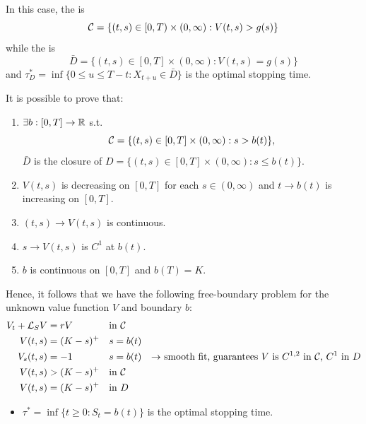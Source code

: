 \begin{remark}
    In this case, the  is
    \[ \mathcal{C} = \{ (t,s) \in [0,T) \times (0, \infty) : V(t,s) > g(s) \} \]
    while the  is
    \[ \bar{D} = \{ (t,s) \in [0,T] \times (0, \infty) : V(t,s) = g(s) \} \]
    and $\tau_D^* = \inf \{ 0 \leq u \leq T-t : X_{t+u} \in \bar{D} \}$ is the optimal stopping time.
    
    It is possible to prove that:
    \begin{enumerate}[label=\alph*)]
        \item $\exists b : [0,T] \to \mathbb R$ s.t.
        \[ \mathcal{C} = \{ (t,s) \in [0,T] \times (0, \infty) : s > b(t) \}, \]
        $\bar{D}$ is the closure of $D = \{ (t,s) \in [0,T] \times (0, \infty) : s \leq b(t) \}$.
        \item $V(t,s)$ is decreasing on $[0,T]$ for each $s \in (0, \infty)$ and $t \to b(t)$ is increasing on $[0,T]$.
        \item $(t,s) \to V(t,s)$ is continuous.
        \item $s \to V(t,s)$ is $C^1$ at $b(t)$.
        \item $b$ is continuous on $[0,T]$ and $b(T) = K$.
    \end{enumerate}
\end{remark}

\begin{remark}
    \begin{center}
    \end{center}
    
    Hence, it follows that we have the following free-boundary problem for the unknown value function $V$ and boundary $b$:
    \begin{align*}
        V_t + \mathcal{L}_S V &= r V && \text{in } \mathcal{C} \\
        V(t,s) &= (K-s)^+ && s = b(t) \\
        V_s(t,s) &= -1 && s = b(t) \quad \text{$\to$ smooth fit, guarantees $V$ is $C^{1,2}$ in $\mathcal{C}$, $C^1$ in $D$} \\
        V(t,s) &> (K-s)^+ && \text{in } \mathcal{C} \\
        V(t,s) &= (K-s)^+ && \text{in } D
    \end{align*}
    \begin{itemize}
        \item $\tau^* = \inf \{ t \geq 0 : S_t = b(t) \}$ is the optimal stopping time.
    \end{itemize}
\end{remark}

